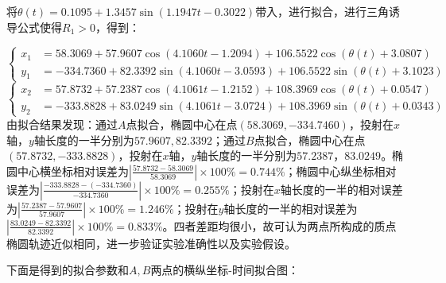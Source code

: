 \documentclass[11pt]{article}
\begin{document}
\begin{enumerate}
\begin{enumerate}
        将$\theta(t)=0.1095+1.3457\sin(1.1947t-0.3022)$带入，进行拟合，进行三角诱导公式使得$R_1>0$，得到：

        $$\left\{
        \begin{aligned}
            x_1&=58.3069+57.9607\cos(4.1060t-1.2094)+106.5522\cos(\theta(t)+3.0807) \\
            y_1&=-334.7360+82.3392\sin(4.1060t-3.0593)+106.5522\sin(\theta(t)+3.1023)
        \end{aligned}
        \right.$$
        $$\left\{
        \begin{aligned}
            x_2&=57.8732+57.2387\cos(4.1061t-1.2152)+108.3969\cos(\theta(t)+0.0547) \\
            y_2&=-333.8828+83.0249\sin(4.1061t-3.0724)+108.3969\sin(\theta(t)+0.0343)
        \end{aligned}
        \right.$$
        由拟合结果发现：通过$A$点拟合，椭圆中心在点$(58.3069,-334.7460)$，投射在$x$轴，$y$轴长度的一半分别为$57.9607,82.3392$；通过$B$点拟合，椭圆中心在点$(57.8732,-333.8828)$，投射在$x$轴，$y$轴长度的一半分别为$57.2387，83.0249$。椭圆中心横坐标相对误差为$\left|\frac{57.8732-58.3069}{58.3069}\right|\times100\%=0.744\% $；椭圆中心纵坐标相对误差为$\left|\frac{-333.8828-(-334.7360)}{-334.7360}\right|\times100\%=0.255\%$；投射在$x$轴长度的一半的相对误差为$\left|\frac{57.2387-57.9607}{57.9607}\right|\times100\%=1.246\%$；投射在$y$轴长度的一半的相对误差为$\left|\frac{83.0249-82.3392}{82.3392}\right|\times100\%=0.833\%$。四者差距均很小，故可认为两点所构成的质点椭圆轨迹近似相同，进一步验证实验准确性以及实验假设。
        
        下面是得到的拟合参数和$A,B$两点的横纵坐标-时间拟合图：


\end{enumerate}
\end{enumerate}
\end{document}
